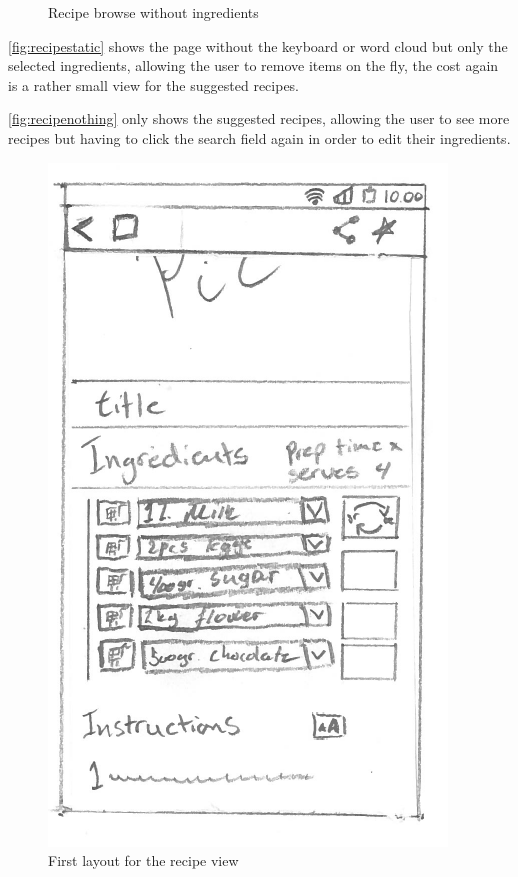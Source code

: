\begin{figure}[H]
\begin{minipage}[b]{0.5\columnwidth}
\caption{Recipe browse without ingredients\label{fig:recipenothing}}
\end{minipage}
\end{figure}

\autoref{fig:recipestatic} shows the page without the keyboard or word cloud but only the selected ingredients, allowing the user to remove items on the fly, the cost again is a rather small view for the suggested recipes.


\autoref{fig:recipenothing} only shows the suggested recipes, allowing the user to see more recipes but having to click the search field again in order to edit their ingredients.

\begin{figure}[H]
\begin{minipage}[b]{0.5\columnwidth}
\centering
\includegraphics[width=0.7\columnwidth]{img/prototypes/recipe_old.pdf}
\caption{First layout for the recipe view\label{fig:recipeold}}
\end{minipage}
\hspace{0.5cm}
\begin{minipage}[b]{0.5\columnwidth}

\end{minipage}
\end{figure}

